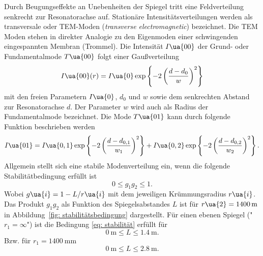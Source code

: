 Durch Beugungseffekte an Unebenheiten der Spiegel tritt eine Feldverteilung senkrecht zur Resonatorachse auf. Stationäre Intensitätsverteilungen
werden als transversale oder TEM-Moden (\textit{transverse electromagnetic}) bezeichnet. Die TEM Moden stehen in direkter Analogie zu den Eigenmoden
einer schwingenden eingespannten Membran (Trommel). Die Intensität $I\ua{00}$ der Grund- oder Fundamentalmode $T\ua{00}$ folgt einer Gaußverteilung
\begin{equation}
  I\ua{00}(r) = I\ua{0}\exp\left\{- 2\left(\frac{d-d_0}{w}\right)^2\right\}
  \label{eq: tem00}
\end{equation}
mit den freien Parametern $I\ua{0}$, $d_0$ und $w$ sowie dem senkrechten Abstand zur Resonatorachse $d$. Der Parameter $w$ wird auch als Radius
der Fundamentalmode bezeichnet. Die Mode $T\ua{01}$ kann durch folgende Funktion beschrieben werden
\begin{equation}
  I\ua{01} = I\ua{0, 1}\exp\left\{- 2\left(\frac{d-d_{0, 1}}{w_{1}}\right)^2\right\} + I\ua{0, 2}\exp\left\{- 2\left(\frac{d-d_{0,2}}{w_{2}}\right)^2\right\}.
  \label{eq: tem01}
\end{equation}
Allgemein stellt sich eine stabile Modenverteilung
ein, wenn die folgende Stabilitätbedingung erfüllt ist
\begin{equation}
  0 \leq g_1 g_2 \leq 1.
  \label{eq: stabilität}
\end{equation}
Wobei $g\ua{i} = 1 - L/r\ua{i}$ mit dem jeweiligen Krümmungsradius $r\ua{i}$. Das Produkt $g_1g_2$
als Funktion des Spiegelsabstandes $L$ ist für $r\ua{2} = \SI{1400}{\meter}$ in Abbildung~\ref{fig: stabilitätsbedingung} dargestellt.
Für einen ebenen Spiegel ("$r_1 = \infty$") ist die Bedingung \eqref{eq: stabilität} erfüllt für
\begin{equation}
  \SI{0}{\meter}\leq L \leq \SI{1.4}{\meter}.
\end{equation}
Bzw. für $r_1 = \SI{1400}{\milli\meter}$
\begin{equation}
  \SI{0}{\meter} \leq L \leq \SI{2.8}{\meter}.
\end{equation}
